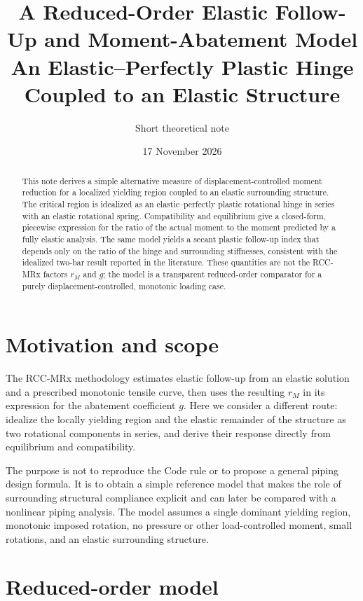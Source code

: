 \documentclass[11pt,a4paper]{article}
\title{A Reduced-Order Elastic Follow-Up and Moment-Abatement Model\\
\large An Elastic--Perfectly Plastic Hinge Coupled to an Elastic Structure}
\author{Short theoretical note}
\date{17 November 2026}
\begin{document}
\maketitle

\begin{abstract}
This note derives a simple alternative measure of displacement-controlled moment reduction for a localized yielding region coupled to an elastic surrounding structure. The critical region is idealized as an elastic--perfectly plastic rotational hinge in series with an elastic rotational spring. Compatibility and equilibrium give a closed-form, piecewise expression for the ratio of the actual moment to the moment predicted by a fully elastic analysis. The same model yields a secant plastic follow-up index that depends only on the ratio of the hinge and surrounding stiffnesses, consistent with the idealized two-bar result reported in the literature. These quantities are not the RCC-MRx factors $r_M$ and $g$; the model is a transparent reduced-order comparator for a purely displacement-controlled, monotonic loading case.
\end{abstract}

\section{Motivation and scope}

The RCC-MRx methodology estimates elastic follow-up from an elastic solution and a prescribed monotonic tensile curve, then uses the resulting $r_M$ in its expression for the abatement coefficient $g$. Here we consider a different route: idealize the locally yielding region and the elastic remainder of the structure as two rotational components in series, and derive their response directly from equilibrium and compatibility.

The purpose is not to reproduce the Code rule or to propose a general piping design formula. It is to obtain a simple reference model that makes the role of surrounding structural compliance explicit and can later be compared with a nonlinear piping analysis. The model assumes a single dominant yielding region, monotonic imposed rotation, no pressure or other load-controlled moment, small rotations, and an elastic surrounding structure.

\section{Reduced-order model}
\end{document}
